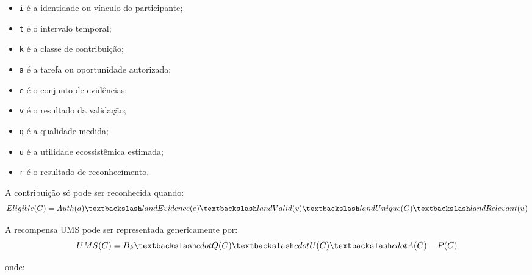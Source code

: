 \documentclass[12pt,a4paper]{article}
\begin{document}
\begin{itemize}
\item \texttt{i} é a identidade ou vínculo do participante;
\item \texttt{t} é o intervalo temporal;
\item \texttt{k} é a classe de contribuição;
\item \texttt{a} é a tarefa ou oportunidade autorizada;
\item \texttt{e} é o conjunto de evidências;
\item \texttt{v} é o resultado da validação;
\item \texttt{q} é a qualidade medida;
\item \texttt{u} é a utilidade ecossistêmica estimada;
\item \texttt{r} é o resultado de reconhecimento.

\end{itemize}
A contribuição só pode ser reconhecida quando:\\

\[
Eligible(C) = Auth(a) \textbackslash\\{\\}land Evidence(e) \textbackslash\\{\\}land Valid(v) \textbackslash\\{\\}land Unique(C) \textbackslash\\{\\}land Relevant(u)\\
\]

A recompensa UMS pode ser representada genericamente por:\\

\[
UMS(C) = B\\_k \textbackslash\\{\\}cdot Q(C) \textbackslash\\{\\}cdot U(C) \textbackslash\\{\\}cdot A(C) - P(C)\\
\]

onde:\\
\end{document}
